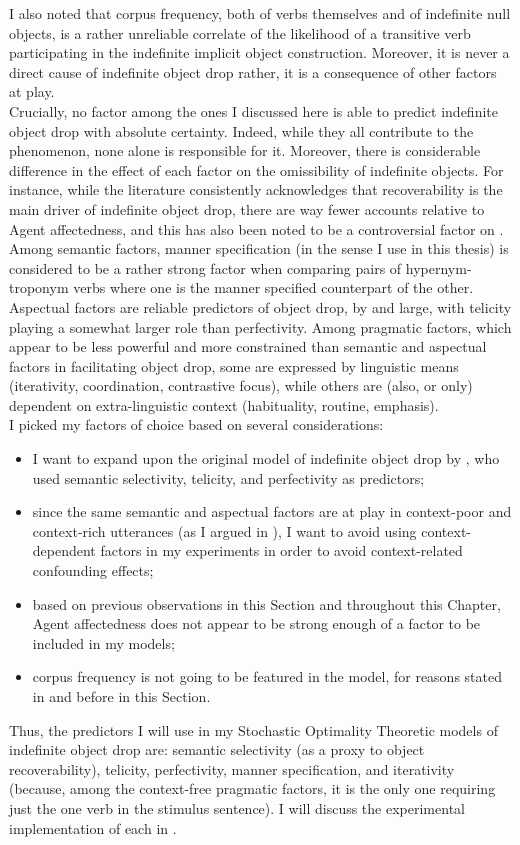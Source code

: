 I also noted that corpus frequency, both of verbs themselves and of indefinite null objects, is a rather unreliable correlate of the likelihood of a transitive verb participating in the indefinite implicit object construction. Moreover, it is never a direct cause of indefinite object drop \textemdash rather, it is a consequence of other factors at play.\\
Crucially, no factor among the ones I discussed here is able to predict indefinite object drop with absolute certainty. Indeed, while they all contribute to the phenomenon, none alone is responsible for it. Moreover, there is considerable difference in the effect of each factor on the omissibility of indefinite objects. For instance, while the literature consistently acknowledges that recoverability is the main driver of indefinite object drop, there are way fewer accounts relative to Agent affectedness, and this has also been noted to be a controversial factor on . Among semantic factors, manner specification (in the sense I use in this thesis) is considered to be a rather strong factor when comparing pairs of hypernym-troponym verbs where one is the manner specified counterpart of the other. Aspectual factors are reliable predictors of object drop, by and large, with telicity playing a somewhat larger role than perfectivity. Among pragmatic factors, which appear to be less powerful and more constrained than semantic and aspectual factors in facilitating object drop, some are expressed by linguistic means (iterativity, coordination, contrastive focus), while others are (also, or only) dependent on extra-linguistic context (habituality, routine, emphasis).\\
I picked my factors of choice based on several considerations:
\begin{itemize}
    \item I want to expand upon the original model of indefinite object drop by \textcite{Medina2007}, who used semantic selectivity, telicity, and perfectivity as predictors;
    \item since the same semantic and aspectual factors are at play in context-poor and context-rich utterances (as I argued in ), I want to avoid using context-dependent factors in my experiments in order to avoid context-related confounding effects;
    \item based on previous observations in this Section and throughout this Chapter, Agent affectedness does not appear to be strong enough of a factor to be included in my models;
    \item corpus frequency is not going to be featured in the model, for reasons stated in  and before in this Section.
\end{itemize}

Thus, the predictors I will use in my Stochastic Optimality Theoretic models of indefinite object drop are: semantic selectivity (as a proxy to object recoverability), telicity, perfectivity, manner specification, and iterativity (because, among the context-free pragmatic factors, it is the only one requiring just the one verb in the stimulus sentence). I will discuss the experimental implementation of each in .